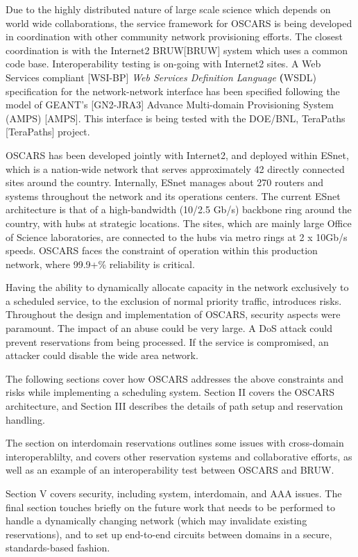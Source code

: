\documentclass[conference]{IEEEtran}
\begin{document}
Due to the highly distributed nature of large scale science which depends
on world wide collaborations, the service framework for OSCARS is being
developed in  coordination with other community network provisioning efforts. 
The closest coordination is with the Internet2 BRUW[BRUW] system which 
uses a common code base. Interoperability testing is on-going with Internet2 
sites. 
A Web Services compliant [WSI-BP]\emph{ Web Services Definition Language}
 \textbf({WSDL}) specification for the network-network 
interface has been specified following the model of GEANT's [GN2-JRA3] 
Advance Multi-domain Provisioning System (AMPS) [AMPS]. This interface is being 
tested with the DOE/BNL, TeraPaths [TeraPaths] project. 

OSCARS has been developed jointly with Internet2, and deployed within ESnet,
which is a nation-wide network that serves approximately 42 directly connected 
sites around the country.  Internally, ESnet manages about 270 routers and 
systems throughout the network and its operations centers.  The current ESnet 
architecture is that of a high-bandwidth (10/2.5 Gb/s) backbone ring 
around the country, with hubs at strategic locations.  The sites, which are 
mainly
large Office of Science laboratories, are connected to the hubs via metro rings at 2 x 10Gb/s speeds.
OSCARS faces the constraint of operation within this production 
network, where 99.9+\% reliability is critical.

Having the ability to dynamically allocate capacity in the network exclusively 
to a scheduled service, to the exclusion of normal priority traffic, introduces 
risks.
Throughout the design and implementation of OSCARS, security aspects were
paramount.  The impact of an abuse could be very
large.  A DoS attack could prevent reservations from being processed.  If the
service is compromised, an attacker could disable the wide area network.

The following sections cover how OSCARS addresses the above constraints and
risks while implementing a scheduling system.  Section II covers the 
OSCARS architecture, and Section III describes the details of
path setup and reservation handling.

The section on interdomain reservations outlines some issues with cross-domain
 interoperablilty, and covers other reservation systems and 
collaborative efforts, as well as 
an example of an interoperability test between OSCARS and BRUW.

Section V covers security, including system, interdomain, and AAA issues.
The final section touches briefly on the future work that needs to be performed
to handle a dynamically changing network (which may invalidate existing
reservations), and to set up end-to-end circuits between domains
in a secure, standards-based fashion.
\end{document}
